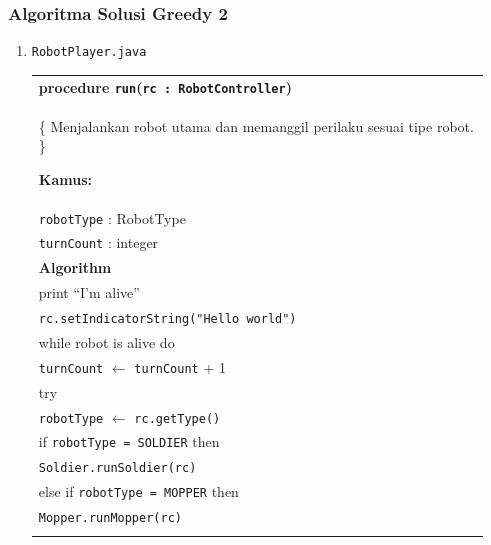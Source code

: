 \documentclass{article}
\newenvironment{pseudobox}
{
\centering
\begin{longtable}{|p{0.94\linewidth}|}
\hline
}
{
\\ \hline
\end{longtable}
\vspace{0.05cm}
}
\begin{document}
\subsubsection{Algoritma Solusi Greedy 2}

\begin{enumerate}[label=\alph*.]

\item \texttt{RobotPlayer.java}

\begin{pseudobox}
\textbf{procedure \texttt{run}(\texttt{rc : RobotController})} \\
\{ Menjalankan robot utama dan memanggil perilaku sesuai tipe robot. \}

\textbf{Kamus:} \\
\hspace*{1.5em}\texttt{robotType} : RobotType \\
\hspace*{1.5em}\texttt{turnCount} : integer \\

\textbf{Algorithm} \\

\hspace*{1.5em}print ``I'm alive'' \\
\hspace*{1.5em}\texttt{rc.setIndicatorString("Hello world")} \\

\hspace*{1.5em}while robot is alive do \\

\hspace*{3em}\texttt{turnCount} $\leftarrow$ \texttt{turnCount} + 1 \\

\hspace*{3em}try \\

\hspace*{4.5em}\texttt{robotType} $\leftarrow$ \texttt{rc.getType()} \\

\hspace*{4.5em}if \texttt{robotType = SOLDIER} then \\
\hspace*{6em}\texttt{Soldier.runSoldier(rc)} \\

\hspace*{4.5em}else if \texttt{robotType = MOPPER} then \\
\hspace*{6em}\texttt{Mopper.runMopper(rc)} \\


\end{pseudobox}
\end{enumerate}
\end{document}
